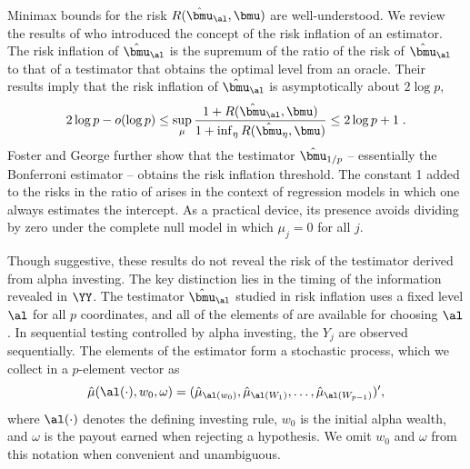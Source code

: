 \documentclass[12pt]{article}
\begin{document}
 Minimax bounds for the risk $R(\hat{\bmu}_\al,\bmu)$ are well-understood.  We
 review the results of \citet{fostergeorge94} who introduced the concept of the
 risk inflation of an estimator. \citep[][obtain similar results.]
  {donohojohnstone94} The risk inflation of $\hat{\bmu}_\al$ is the supremum of
 the ratio of the risk of $\hat{\bmu}_\al$ to that of a testimator that obtains
 the optimal level from an oracle.  Their results imply that the risk inflation
 of $\hat{\bmu}_\al$ is asymptotically about $2 \log p$,
 \begin{equation}
    2 \log p - o(\log p) 
    \le
    \sup_\mu  \frac{1 + R(\hat{\bmu}_\al,\bmu)}
                   {1 + \inf_\eta{R(\hat{\bmu}_\eta,\bmu)}}  
    \le 
    2 \log p + 1 \;.
 \label{eq:ri}
 \end{equation}
 Foster and George further show that the testimator $\hat{\bmu}_{1/p}$ --
 essentially the Bonferroni estimator -- obtains the risk inflation threshold.
  The constant 1 added to the risks in the ratio of  arises in the
 context of regression models in which one always estimates the intercept.  As a
 practical device, its presence avoids dividing by zero under the complete null
 model in which $\mu_j = 0$ for all $j$.


 Though suggestive, these results do not reveal the risk of the testimator
 derived from alpha investing.  The key distinction lies in the timing of the
 information revealed in $\YY$.  The testimator $\hat{\bmu}_\al$ studied in risk
 inflation uses a fixed level $\al$ for all $p$ coordinates, and all of the
 elements of \YY are available for choosing $\al$.  In sequential testing
 controlled by alpha investing, the $Y_j$ are observed sequentially.  The
 elements of the estimator form a stochastic process, which we collect in a
 $p$-element vector as
 \begin{equation}
   \hat\mu(\al(\cdot),w_0,\omega) = (\hat\mu_{\al(w_0)}, \hat\mu_{\al(W_1)}, \ldots, 
                       \hat\mu_{\al(W_{p-1})})',
 \label{eq:muHatAlphaInv}
 \end{equation}
 where $\al(\cdot)$ denotes the defining investing rule, $w_0$ is the initial
 alpha wealth, and $\omega$ is the payout earned when rejecting a hypothesis.
  We omit $w_0$ and $\omega$ from this notation when convenient and unambiguous.
 
\end{document}
